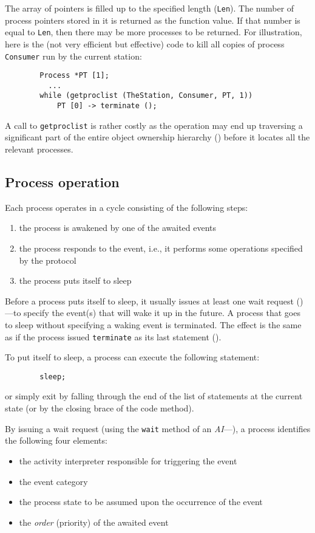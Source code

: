 The array of pointers is filled up to the specified length
({\tt Len}).
The number of process pointers stored in it is returned as the function value.
If that number is equal to {\tt Len}, then there may be more processes to
be returned.
For illustration, here is the (not very efficient but effective)
code to kill all copies of process {\tt Consumer} run by the current station:
\begin{verbatim}
        Process *PT [1];
          ...
        while (getproclist (TheStation, Consumer, PT, 1))
            PT [0] -> terminate ();
\end{verbatim}
\noindent
A call to {\tt getproclist} is rather costly as the operation may end up
traversing a significant part of the entire object ownership hierarchy
() before it locates all the relevant processes.

\subsection{Process operation}
\label{rm_pr_po}

Each process operates in a cycle consisting of the following steps:
\begin{enumerate}
\item
the process is awakened by one of the awaited events
\item
the process responds to the event, i.e., it performs some operations
specified by the protocol
\item
the process puts itself to sleep
\end{enumerate}

Before a process puts itself to sleep, it usually issues at least one
wait request ()---to specify the event(s) that will wake
it up in the future.
A process that goes to sleep without specifying a waking event is terminated.
The effect is the same
as if the process issued {\tt terminate} as its last
statement ().

To put itself to sleep, a process can execute
the following statement:
\begin{verbatim}
        sleep;
\end{verbatim}
or simply exit by falling through the end of the list of statements at the
current state (or by the closing brace of the code method).

By issuing a wait request (using the {\tt wait} method of an
{\em AI\/}---), a process identifies the following
four elements:
\begin{itemize}
\item
the activity interpreter responsible for triggering the event
\item
the event category
\item
the process state to be assumed upon the occurrence of the event
\item
the {\em order\/} (priority) of the awaited event
\end{itemize}

